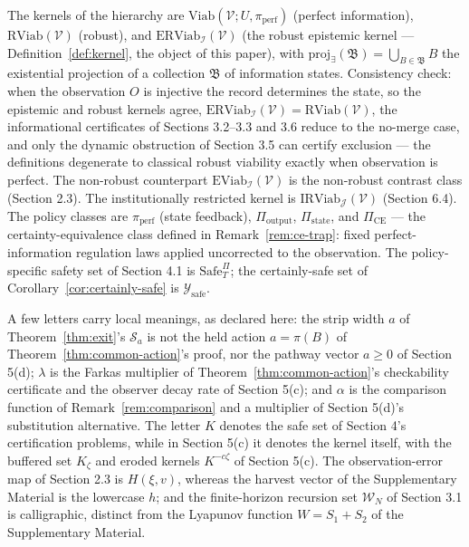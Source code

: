 \documentclass[10pt,twocolumn]{article}
\theoremstyle{definition}
\begin{document}
The kernels of the hierarchy are
\(\mathrm{Viab}(\mathcal{V}; U, \pi_{\mathrm{perf}})\) (perfect
information), \(\mathrm{RViab}(\mathcal{V})\) (robust), and
\(\mathrm{ERViab}_{\mathcal{I}}(\mathcal{V})\) (the robust epistemic
kernel --- Definition~\ref{def:kernel}, the object of this paper), with
\(\mathrm{proj}_{\exists}(\mathfrak{B}) = \bigcup_{B \in \mathfrak{B}} B\)
the existential projection of a collection \(\mathfrak{B}\) of information states. Consistency check: when the observation \(O\) is injective the record determines the state, so the epistemic and robust kernels agree, \(\mathrm{ERViab}_{\mathcal{I}}(\mathcal{V}) = \mathrm{RViab}(\mathcal{V})\), the informational certificates of Sections 3.2--3.3 and 3.6 reduce to the no-merge case, and only the dynamic obstruction of Section 3.5 can certify exclusion --- the definitions degenerate to classical robust viability exactly when observation is perfect. The non-robust counterpart
\(\mathrm{EViab}_{\mathcal{I}}(\mathcal{V})\) is the non-robust contrast class (Section 2.3). The institutionally restricted kernel is \(\mathrm{IRViab}_{\mathcal{J}}(\mathcal{V})\) (Section 6.4). The policy classes
are \(\pi_{\mathrm{perf}}\) (state feedback), \(\Pi_{\mathrm{output}}\),
\(\Pi_{\mathrm{state}}\), and \(\Pi_{\mathrm{CE}}\) --- the
certainty-equivalence class defined in Remark~\ref{rem:ce-trap}: fixed
perfect-information regulation laws applied uncorrected to the
observation. The policy-specific safety set of Section 4.1 is
\(\mathrm{Safe}^{\Pi}_T\); the certainly-safe set of Corollary~\ref{cor:certainly-safe} is
\(\mathcal{Y}_{\mathrm{safe}}\).

A few letters carry local meanings, as declared here: the strip width \(a\) of
Theorem~\ref{thm:exit}'s \(\mathcal{S}_a\) is not the held action
\(a = \pi(B)\) of Theorem~\ref{thm:common-action}'s proof, nor the
pathway vector \(a \ge 0\) of Section 5(d); \(\lambda\) is the Farkas
multiplier of Theorem~\ref{thm:common-action}'s checkability
certificate and the observer decay rate of Section 5(c); and
\(\alpha\) is the comparison function of Remark~\ref{rem:comparison}
and a multiplier of Section 5(d)'s substitution alternative. The
letter \(K\) denotes the safe set of Section 4's certification
problems, while in Section 5(c) it denotes the kernel
itself, with the buffered set \(K_\zeta\) and eroded kernels
\(K^{-c\zeta}\) of Section 5(c). The observation-error map of
Section 2.3 is \(H(\xi, v)\), whereas the harvest vector of
the Supplementary Material is the lowercase \(h\); and the finite-horizon recursion
set \(\mathcal{W}_N\) of Section 3.1 is calligraphic, distinct from
the Lyapunov function \(W = S_1 + S_2\) of the Supplementary Material.
\end{document}
